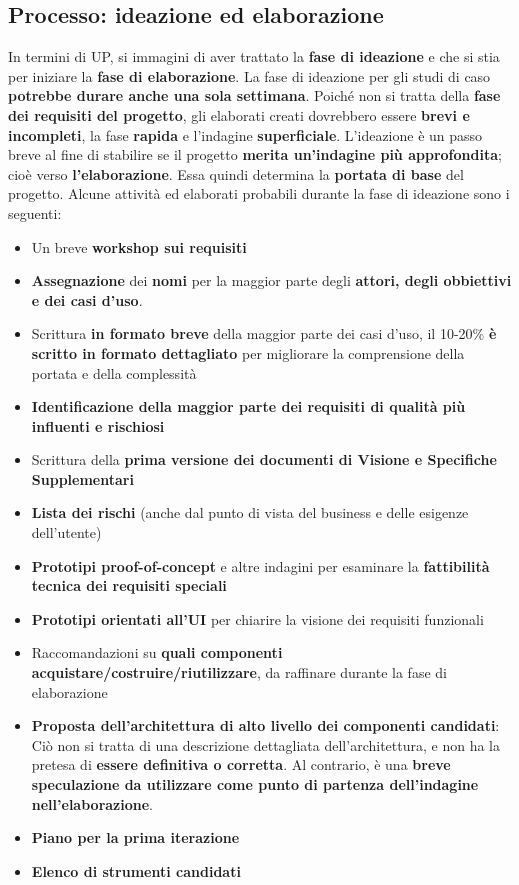 \documentclass[12pt]{article}
\begin{document}
\subsection{Processo: ideazione ed elaborazione}
In termini di UP, si immagini di aver trattato la \textbf{fase di ideazione} e che si stia per iniziare la \textbf{fase di elaborazione}.
La fase di ideazione per gli studi di caso \textbf{potrebbe durare anche una sola settimana}.
Poiché non si tratta della \textbf{fase dei requisiti del progetto}, gli elaborati creati dovrebbero essere \textbf{brevi e incompleti}, la fase \textbf{rapida} e l'indagine \textbf{superficiale}.
L'ideazione è un passo breve al fine di stabilire se il progetto \textbf{merita un'indagine più approfondita}; cioè verso \textbf{l'elaborazione}. Essa quindi determina
la \textbf{portata di base} del progetto.
Alcune attività ed elaborati probabili durante la fase di ideazione sono i seguenti:
\begin{itemize}
    \item Un breve \textbf{workshop sui requisiti}
    \item \textbf{Assegnazione} dei \textbf{nomi} per la maggior parte degli \textbf{attori, degli obbiettivi e dei casi d'uso}.
    \item Scrittura \textbf{in formato breve} della maggior parte dei casi d'uso, il 10-20\% \textbf{è scritto in formato dettagliato} per migliorare la comprensione della portata e della complessità
    \item \textbf{Identificazione della maggior parte dei requisiti di qualità più influenti e rischiosi}
    \item Scrittura della \textbf{prima versione dei documenti di Visione e Specifiche Supplementari}
    \item \textbf{Lista dei rischi} (anche dal punto di vista del business e delle esigenze dell'utente)
    \item \textbf{Prototipi proof-of-concept} e altre indagini per esaminare la \textbf{fattibilità tecnica dei requisiti speciali}
    \item \textbf{Prototipi orientati all'UI} per chiarire la visione dei requisiti funzionali
    \item Raccomandazioni su \textbf{quali componenti acquistare/costruire/riutilizzare}, da raffinare durante la fase di elaborazione
    \item \textbf{Proposta dell'architettura di alto livello dei componenti candidati}: Ciò non si tratta di una descrizione dettagliata dell'architettura, e non ha la pretesa di \textbf{essere definitiva o corretta}.
    Al contrario, è una \textbf{breve speculazione da utilizzare come punto di partenza dell'indagine nell'elaborazione}.
    \item \textbf{Piano per la prima iterazione}
    \item \textbf{Elenco di strumenti candidati}
\end{itemize}
\end{document}
